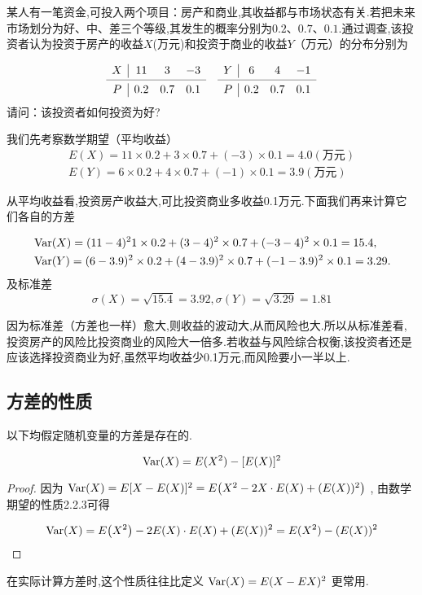 \begin{example}
	某人有一笔资金,可投入两个项目：房产和商业,其收益都与市场状态有关.若把未来市场划分为好、中、差三个等级,其发生的概率分别为$ 0.2$、$0.7$、$0.1 $.通过调查,该投资者认为投资于房产的收益$ X $(万元)和投资于商业的收益$ Y $（万元）的分布分别为
	
	\[
	\begin{array}{c|ccccc|ccc}
	X     & 11    & 3     & -3    &       & Y     & 6     & 4     & -1 \\
	\cmidrule{1-4}\cmidrule{6-9}    P     & 0.2   & 0.7   & 0.1   &       & P     & 0.2   & 0.7   & 0.1 \\
	\end{array}
	\]
请问：该投资者如何投资为好?
\end{example}
\begin{solution} 我们先考察数学期望（平均收益）
	\[
	\begin{array}{c}
	{E(X)=11 \times 0.2+3 \times 0.7+(-3) \times 0.1=4.0 (\text{万元})} \\
	{E(Y)=6 \times 0.2+4 \times 0.7+(-1) \times 0.1=3.9(\text{万元})}
	\end{array}
	\]
	
	从平均收益看,投资房产收益大,可比投资商业多收益0.1万元.下面我们再来计算它们各自的方差
	
	\[
	\begin{aligned}
	& \operatorname{Var} (X) = (11-4)^{2} 1 \times 0.2+(3-4)^{2} \times 0.7+(-3-4)^{2} \times 0.1=15.4, \\
	& \operatorname{Var} (Y) = (6-3.9)^{2} \times 0.2+(4-3.9)^{2} \times 0.7+(-1-3.9)^{2} \times 0.1=3.29.
	\end{aligned}
	\]
	及标准差
	\[
	\sigma(X)=\sqrt{15.4}=3.92, \sigma(Y)=\sqrt{3.29}=1.81
	\]
	
	因为标准差（方差也一样）愈大,则收益的波动大,从而风险也大.所以从标准差看,投资房产的风险比投资商业的风险大一倍多.若收益与风险综合权衡,该投资者还是应该选择投资商业为好,虽然平均收益少0.1万元,而风险要小一半以上.
	
\end{solution}

\subsection{方差的性质}

以下均假定随机变量的方差是存在的.

\begin{property}
	\[
	  \operatorname{Var}(X)=E(X^2)-[E(X)]^{2}
	\]
	
	\begin{proof}
		因为 $ \Var(X)=E[X-E(X)]^{2}=E\left(X^{2}-2 X \cdot E(X)+(E(X))^{2}\right)$ , 由数学期望的性质2.2.3可得
		
		\[
		  \Var (X)=E\left(X^{2}\right)-2 E(X) \cdot E(X)+(E(X))^{2}=E(X^2)-(E(X))^{2}
		\]
		
	\end{proof}	
	
	在实际计算方差时,这个性质往往比定义 $\operatorname{Var} (X)=E(X-E X)^{2}$ 更常用.
	
\end{property}

